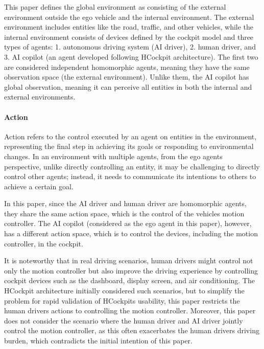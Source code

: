 \documentclass[
]{article}
\begin{document}
This paper defines the global environment as consisting of the external
environment outside the ego vehicle and the internal environment. The
external environment includes entities like the road, traffic, and other
vehicles, while the internal environment consists of devices defined by
the cockpit model and three types of agents: 1. autonomous driving
system (AI driver), 2. human driver, and 3. AI copilot (an agent
developed following HCockpit architecture). The first two are considered
independent homomorphic agents, meaning they have the same observation
space (the external environment). Unlike them, the AI copilot has global
observation, meaning it can perceive all entities in both the internal
and external environments.

\paragraph{Action}\label{action}

Action refers to the control executed by an agent on entities in the
environment, representing the final step in achieving its goals or
responding to environmental changes. In an environment with multiple
agents, from the ego agent\textquotesingle s perspective, unlike
directly controlling an entity, it may be challenging to directly
control other agents; instead, it needs to communicate its intentions to
others to achieve a certain goal.

In this paper, since the AI driver and human driver are homomorphic
agents, they share the same action space, which is the control of the
vehicle\textquotesingle s motion controller. The AI copilot (considered
as the ego agent in this paper), however, has a different action space,
which is to control the devices, including the motion controller, in the
cockpit.

It is noteworthy that in real driving scenarios, human drivers might
control not only the motion controller but also improve the driving
experience by controlling cockpit devices such as the dashboard, display
screen, and air conditioning. The HCockpit architecture initially
considered such scenarios, but to simplify the problem for rapid
validation of HCockpit\textquotesingle s usability, this paper restricts
the human driver\textquotesingle s actions to controlling the motion
controller. Moreover, this paper does not consider the scenario where
the human driver and AI driver jointly control the motion controller, as
this often exacerbates the human driver\textquotesingle s driving
burden, which contradicts the initial intention of this paper.
\end{document}
